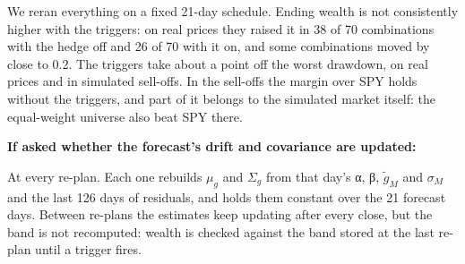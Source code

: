 {{  We reran everything on a fixed 21-day schedule. Ending wealth is not consistently higher with the triggers: on
  real prices they raised it in 38 of 70 combinations with the hedge off and 26 of 70 with it on, and some
  combinations moved by close to 0.2. The triggers take about a point off the worst drawdown, on real prices and
  in simulated sell-offs. In the sell-offs the margin over SPY holds without the triggers, and part of it belongs
  to the simulated market itself: the equal-weight universe also beat SPY there.\par\bigskip
  \textbf{If asked whether the forecast's drift and covariance are updated:}\par\medskip
  At every re-plan. Each one rebuilds $\mu_g$ and $\Sigma_g$ from that day's α, β, $\tilde g_M$ and $\sigma_M$ and
  the last 126 days of residuals, and holds them constant over the 21 forecast days. Between re-plans the estimates
  keep updating after every close, but the band is not recomputed: wealth is checked against the band stored at the
  last re-plan until a trigger fires.}
}
